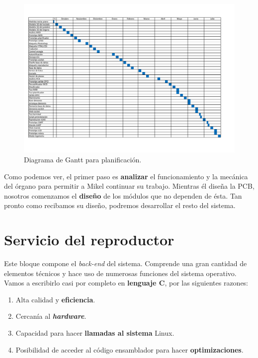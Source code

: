 \smallskip

\begin{figure}[H]
	\noindent \begin{centering}
		\includegraphics[clip=true,trim=20 50 50 50,width=\linewidth]{capitulo5/gantt}
		\par\end{centering}
	\smallskip
	\caption{\label{fig:gantt} Diagrama de Gantt para planificación.}
\end{figure} 

\smallskip

Como podemos ver, el primer paso es \textbf{analizar} el funcionamiento y la mecánica del órgano para permitir a Mikel continuar su trabajo. Mientras él diseña la \acrshort{PCB}, nosotros comenzamos el \textbf{diseño} de los módulos que no dependen de ésta. Tan pronto como recibamos su diseño, podremos desarrollar el resto del sistema.

\section{Servicio del reproductor}

Este bloque compone el \textit{back-end} del sistema. Comprende una gran cantidad de elementos técnicos y hace uso de numerosas funciones del sistema operativo. Vamos a escribirlo casi por completo en \textbf{lenguaje C}, por las siguientes razones:

\begin{enumerate}
	\item Alta calidad y \textbf{eficiencia}.
	\item Cercanía al \textbf{\textit{hardware}}.
	\item Capacidad para hacer \textbf{llamadas al sistema} Linux.
	\item Posibilidad de acceder al código ensamblador para hacer \textbf{optimizaciones}.
\end{enumerate}

